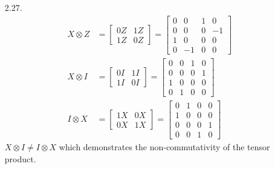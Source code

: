 \documentclass[a4paper,12pt]{article}
\begin{document}
\begin{enumerate}
	\item[2.27.]
	\begin{align*}
		X \otimes Z
		&= \left[ \begin{array}{cc}
		0Z & 1Z \\
		1Z & 0Z
		\end{array} \right]
		= \left[ \begin{array}{cccc}
		0 & 0 & 1 & 0 \\
		0 & 0 & 0 & -1 \\
		1 & 0 & 0 & 0 \\
		0 & -1 & 0 & 0
		\end{array} \right]
		\\
		X \otimes I
		&= \left[ \begin{array}{cc}
		0I & 1I \\
		1I & 0I
		\end{array} \right]
		= \left[ \begin{array}{cccc}
		0 & 0 & 1 & 0 \\
		0 & 0 & 0 & 1 \\
		1 & 0 & 0 & 0 \\
		0 & 1 & 0 & 0
		\end{array} \right]
		\\
		I \otimes X
		&= \left[ \begin{array}{cc}
		1X & 0X \\
		0X & 1X
		\end{array} \right]
		= \left[ \begin{array}{cccc}
		0 & 1 & 0 & 0 \\
		1 & 0 & 0 & 0 \\
		0 & 0 & 0 & 1 \\
		0 & 0 & 1 & 0
		\end{array} \right]
	\end{align*}
	$X \otimes I \neq I \otimes X$ which demonstrates the non-commutativity of the tensor product.
	

\end{enumerate}
\end{document}
